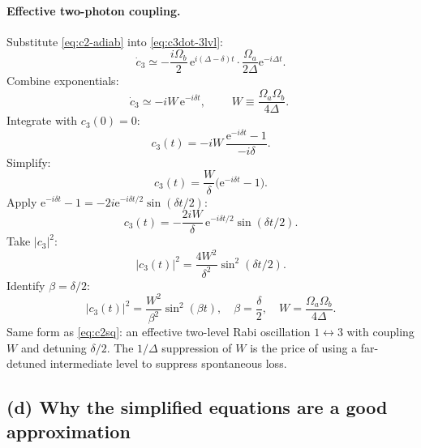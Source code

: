 \documentclass[11pt]{article}
\begin{document}
\paragraph{Effective two-photon coupling.} Substitute \eqref{eq:c2-adiab} into \eqref{eq:c3dot-3lvl}:
\begin{equation}
\dot c_{3}\simeq -\frac{i\Omega_{b}}{2}\,\mathrm{e}^{i(\Delta-\delta)t}\cdot\frac{\Omega_{a}}{2\Delta}\mathrm{e}^{-i\Delta t}.
\end{equation}
Combine exponentials:
\begin{equation}
\dot c_{3}\simeq -i W\,\mathrm{e}^{-i\delta t},\qquad \boxed{\;W\equiv\frac{\Omega_{a}\Omega_{b}}{4\Delta}.\;}
\label{eq:c3dot-eff}
\end{equation}
Integrate with $c_{3}(0)=0$:
\begin{equation}
c_{3}(t)=-iW\,\frac{\mathrm{e}^{-i\delta t}-1}{-i\delta}.
\end{equation}
Simplify:
\begin{equation}
c_{3}(t)=\frac{W}{\delta}\bigl(\mathrm{e}^{-i\delta t}-1\bigr).
\end{equation}
Apply $\mathrm{e}^{-i\delta t}-1=-2i\mathrm{e}^{-i\delta t/2}\sin(\delta t/2)$:
\begin{equation}
c_{3}(t)=-\frac{2iW}{\delta}\,\mathrm{e}^{-i\delta t/2}\sin(\delta t/2).
\end{equation}
Take $|c_{3}|^{2}$:
\begin{equation}
|c_{3}(t)|^{2}=\frac{4W^{2}}{\delta^{2}}\sin^{2}(\delta t/2).
\end{equation}
Identify $\beta=\delta/2$:
\begin{equation}
\boxed{\;|c_{3}(t)|^{2}=\frac{W^{2}}{\beta^{2}}\sin^{2}(\beta t),\quad \beta=\frac{\delta}{2},\quad W=\frac{\Omega_{a}\Omega_{b}}{4\Delta}.\;}
\label{eq:c3sq}
\end{equation}
Same form as \eqref{eq:c2sq}: an effective two-level Rabi oscillation $1\leftrightarrow 3$ with coupling $W$ and detuning $\delta/2$. The $1/\Delta$ suppression of $W$ is the price of using a far-detuned intermediate level to suppress spontaneous loss.

\subsection*{(d) Why the simplified equations are a good approximation}
\end{document}
